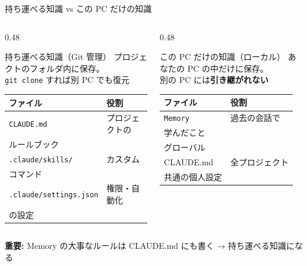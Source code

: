 \documentclass[aspectratio=169, 14pt]{beamer}
\newcommand{\warn}[1]{\textcolor{sfred}{\textbf{#1}}}
\begin{document}
\begin{frame}{持ち運べる知識 vs この PC だけの知識}
  \begin{columns}[T]
    \begin{column}{0.48\textwidth}
      \begin{exampleblock}{持ち運べる知識（Git 管理）}
        {\small プロジェクトのフォルダ内に保存。\\
        \texttt{git clone} すれば別 PC でも復元}

        \vspace{0.3em}

        {\footnotesize
        \begin{tabular}{lp{24mm}}
          \hline
          \textbf{ファイル} & \textbf{役割} \\
          \hline
          \texttt{CLAUDE.md}  & プロジェクトの\\ルールブック \\
          \texttt{.claude/skills/} & カスタム\\コマンド \\
          \texttt{.claude/settings.json} & 権限・自動化\\の設定 \\
          \hline
        \end{tabular}
        }
      \end{exampleblock}
    \end{column}
    \begin{column}{0.48\textwidth}
      \begin{alertblock}{この PC だけの知識（ローカル）}
        {\small あなたの PC の中だけに保存。\\
        別の PC には\warn{引き継がれない}}

        \vspace{0.3em}

        {\footnotesize
        \begin{tabular}{lp{24mm}}
          \hline
          \textbf{ファイル} & \textbf{役割} \\
          \hline
          \texttt{Memory}  & 過去の会話で\\学んだこと \\
          グローバル\\CLAUDE.md & 全プロジェクト\\共通の個人設定 \\
          \hline
        \end{tabular}
        }
      \end{alertblock}
    \end{column}
  \end{columns}

  \vspace{0.2em}

  {\scriptsize \textbf{重要:}
    Memory の大事なルールは CLAUDE.md にも書く → 持ち運べる知識になる}
\end{frame}
\end{document}
